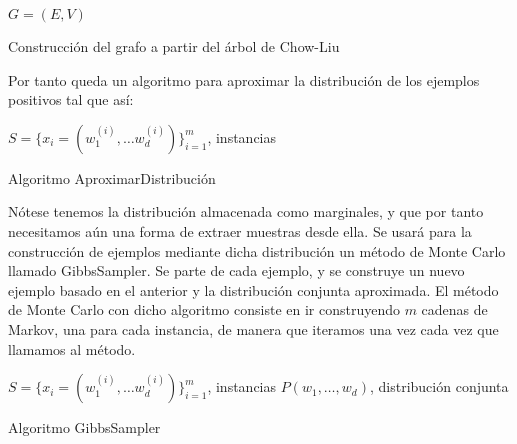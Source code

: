 \begin{algorithm}[H]
\begin{algorithmic}[1]
 \REQUIRE $G = (E,V)$
   \ELSE
   \ENDIF
 \ENDFOR
 \NEWLINE
\end{algorithmic}
\caption{Construcción del grafo a partir del árbol de Chow-Liu}
\label{alg:make-directed}
\end{algorithm}

Por tanto queda un algoritmo para aproximar la distribución de los ejemplos positivos tal que así:

\begin{algorithm}[H]
\begin{algorithmic}[1]
  \REQUIRE $S = \{x_i=(w_1^{(i)}, \ldots w_d^{(i)})\}_{i=1}^m$, instancias
  \ENDFOR
\end{algorithmic}
\caption{Algoritmo AproximarDistribución}
\label{alg:aproxdist}
\end{algorithm}

Nótese tenemos la distribución almacenada como marginales, y que por tanto necesitamos aún una forma de extraer
muestras desde ella. Se usará para la construcción de ejemplos mediante dicha distribución un método de Monte 
Carlo llamado GibbsSampler. Se parte de cada ejemplo, y se construye un nuevo ejemplo basado en el anterior y 
la distribución conjunta aproximada. El método de Monte Carlo con dicho algoritmo consiste en ir construyendo 
$m$ cadenas de Markov, una para cada instancia, de manera que iteramos una vez cada vez que llamamos al método.

\begin{algorithm}[H]
\begin{algorithmic}[1]
  \REQUIRE $S = \{x_i=(w_1^{(i)}, \ldots w_d^{(i)})\}_{i=1}^m$, instancias
  \REQUIRE $P(w_1, \ldots, w_d)$, distribución conjunta
    \ENDFOR
  \ENDFOR
\end{algorithmic}
\caption{Algoritmo GibbsSampler}
\label{alg:gibbs}
\end{algorithm}

